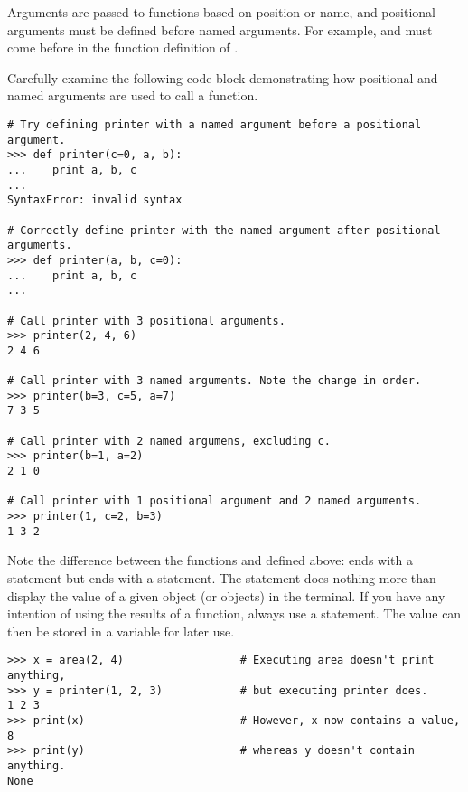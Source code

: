 Arguments are passed to functions based on position or name, and positional arguments must be defined before named arguments.
For example,  and  must come before  in the function definition of .

Carefully examine the following code block demonstrating how positional and named arguments are used to call a function.
\begin{lstlisting}
# Try defining printer with a named argument before a positional argument.
>>> def printer(c=0, a, b):
...    print a, b, c
...
SyntaxError: invalid syntax

# Correctly define printer with the named argument after positional arguments.
>>> def printer(a, b, c=0):
...    print a, b, c
...

# Call printer with 3 positional arguments.
>>> printer(2, 4, 6)
2 4 6

# Call printer with 3 named arguments. Note the change in order.
>>> printer(b=3, c=5, a=7)
7 3 5

# Call printer with 2 named argumens, excluding c.
>>> printer(b=1, a=2)
2 1 0

# Call printer with 1 positional argument and 2 named arguments.
>>> printer(1, c=2, b=3)
1 3 2
\end{lstlisting}

Note the difference between the functions  and  defined above:  ends with a  statement but  ends with a  statement.
The  statement does nothing more than display the value of a given object (or objects) in the terminal.
If you have any intention of using the results of a function, always use a  statement.
The value can then be stored in a variable for later use.

\begin{lstlisting}
>>> x = area(2, 4)                  # Executing area doesn't print anything,
>>> y = printer(1, 2, 3)            # but executing printer does.
1 2 3
>>> print(x)                        # However, x now contains a value,
8
>>> print(y)                        # whereas y doesn't contain anything.
None
\end{lstlisting}

\begin{comment}   %
The most general form of a function definition is as follows.
\begin{lstlisting}
def fn(*args, **kwargs):
\end{lstlisting}
This means that ``\li{fn} accepts arguments and keyword arguments.''
The arguments, \li{args}, are stored as a tuple; the keyword arguments, \li{kwargs}, are stored as a dictionary.
Such functions can accept any number of arguments and keyword arguments.
\begin{lstlisting}
>>> def fn(*args, **kwargs):
...     print "Positional: ", args
...     print "Keyword: ", kwargs
...     
>>> fn("Hello", 2, 1, apples = 3, oranges = 2)
<<Positional: ('Hello', 2, 1)
Keyword: {'apples': 3, 'oranges': 2}>>
\end{lstlisting}
\end{comment}

